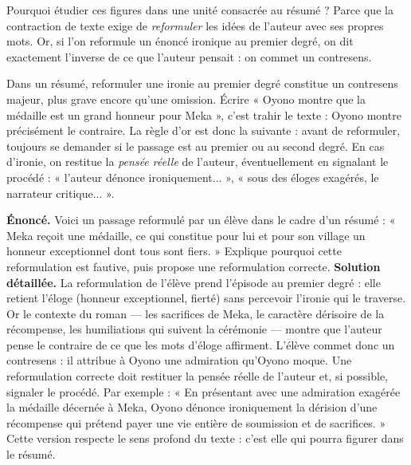 \documentclass[11pt]{article}
\newcommand{\cle}[1]{{\popxbold\color{popdark}#1}}
\newcounter{popsec}
\newcounter{popsub}
\newcommand{\courssub}[1]{%
  \stepcounter{popsub}%
  \par\vspace{9pt}\noindent{\popxbold\fontsize{11.5}{13}\selectfont\color{popink}{\color{poporange}\thepopsec.\thepopsub}\hspace{6pt}#1}\par\nopagebreak\vspace{4pt}
}
\begin{document}
\courssub{Le lien avec la contraction de texte}

Pourquoi étudier ces figures dans une unité consacrée au résumé ? Parce que la contraction de texte exige de \emph{reformuler} les idées de l'auteur avec ses propres mots. Or, si l'on reformule un énoncé ironique au premier degré, on dit exactement l'inverse de ce que l'auteur pensait : on commet un contresens.

\begin{attention}
Dans un résumé, reformuler une ironie au premier degré constitue un \cle{contresens} majeur, plus grave encore qu'une omission. Écrire « Oyono montre que la médaille est un grand honneur pour Meka », c'est trahir le texte : Oyono montre précisément le contraire. La règle d'or est donc la suivante : avant de reformuler, toujours se demander si le passage est au premier ou au second degré. En cas d'ironie, on restitue la \emph{pensée réelle} de l'auteur, éventuellement en signalant le procédé : « l'auteur dénonce ironiquement... », « sous des éloges exagérés, le narrateur critique... ».
\end{attention}

\begin{exoresolu}
\textbf{Énoncé.} Voici un passage reformulé par un élève dans le cadre d'un résumé : « Meka reçoit une médaille, ce qui constitue pour lui et pour son village un honneur exceptionnel dont tous sont fiers. » Explique pourquoi cette reformulation est fautive, puis propose une reformulation correcte.
\tcblower
\textbf{Solution détaillée.} La reformulation de l'élève prend l'épisode au premier degré : elle retient l'éloge (honneur exceptionnel, fierté) sans percevoir l'ironie qui le traverse. Or le contexte du roman — les sacrifices de Meka, le caractère dérisoire de la récompense, les humiliations qui suivent la cérémonie — montre que l'auteur pense le contraire de ce que les mots d'éloge affirment. L'élève commet donc un contresens : il attribue à Oyono une admiration qu'Oyono moque. Une reformulation correcte doit restituer la pensée réelle de l'auteur et, si possible, signaler le procédé. Par exemple : « En présentant avec une admiration exagérée la médaille décernée à Meka, Oyono dénonce ironiquement la dérision d'une récompense qui prétend payer une vie entière de soumission et de sacrifices. » Cette version respecte le sens profond du texte : c'est elle qui pourra figurer dans le résumé.
\end{exoresolu}
\end{document}
